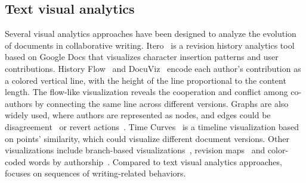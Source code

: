 
\subsection{Text visual analytics}
Several visual analytics approaches have been designed to analyze the evolution of documents in collaborative writing. Itero~\cite{turkay2018itero} is a revision history analytics tool based on Google Docs that visualizes character insertion patterns and user contributions. History Flow~\cite{viegas2004studying} and DocuViz~\cite{wang2015docuviz} encode each author's contribution as a colored vertical line, with the height of the line proportional to the content length. The flow-like visualization reveals the cooperation and conflict among co-authors by connecting the same line across different versions. Graphs are also widely used, where authors are represented as nodes, and edges could be disagreement~\cite{flock2015whovis} or revert actions~\cite{kittur2007he}. Time Curves~\cite{bach2015time} is a timeline visualization based on points' similarity, which could visualize different document versions. Other visualizations include branch-based visualizations~\cite{perez2018organic}, revision maps~\cite{southavilay2013analysis} and color-coded words by authorship~\cite{flock2015towards, torres2019visualizing}.
Compared to text visual analytics approaches, \name{} focuses on sequences of writing-related behaviors.


